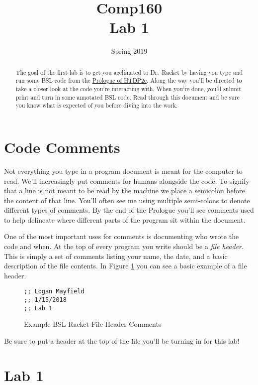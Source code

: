 \documentclass[nobib]{tufte-handout}
\title{Comp160 \\ Lab 1 }
\author{}
\date{ Spring 2019 }
\begin{document}
\maketitle

\begin{abstract}
The goal of the first lab is to get you acclimated to Dr.\ Racket by having you type and run some BSL code from the \href{http://htdp.org/2018-01-06/Book/part_prologue.html}{Prologue of HTDP2e}. Along the way you'll be directed to take a closer look at the code you're interacting with. When you're done, you'll submit print and turn in some annotated BSL code. Read through this document and be sure you know what is expected of you before diving into the work.
\end{abstract}

\section{Code Comments}

Not everything you type in a program document is meant for the computer to read. We'll increasingly put comments for humans alongside the code. To signify that a line is not meant to be read by the machine we place a semicolon before the content of that line. You'll often see me using multiple semi-colons to denote different types of comments.  By the end of the Prologue you'll see comments used to help delineate where different parts of the program sit within the document.

One of the most important uses for comments is documenting who wrote the code and when. At the top of every program you write should be a \textit{file header}. This is simply a set of comments listing your name, the date, and a basic description of the file contents. In Figure \ref{fig1} you can see a basic example of a file header.

\begin{figure}
\begin{lstlisting}
;; Logan Mayfield
;; 1/15/2018
;; Lab 1
\end{lstlisting}
\caption{Example BSL Racket File Header Comments}
\label{fig1}
\end{figure}

Be sure to put a header at the top of the file you'll be turning in for this lab!

\section{Lab 1}
\end{document}
